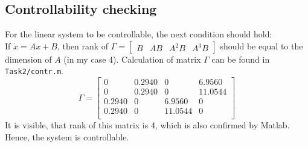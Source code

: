 \documentclass[a4paper,12pt]{article}
\begin{document}
    \subsection{Controllability checking}
    For the linear system to be controllable, the next condition should hold:\\
    If $\dot x = Ax + B$, then rank of $\Gamma = 
    \begin{bmatrix}
        B & AB & A^2B & A^3B
    \end{bmatrix}$ should be equal to the dimension of $A$ (in my case 4).
    Calculation of matrix $\Gamma$ can be found in \texttt{Task2/contr.m}.
    \begin{equation}
        \Gamma = 
        \begin{bmatrix}
        0 & 0.2940 & 0 & 6.9560\\
        0 & 0.2940 & 0 & 11.0544\\
        0.2940 & 0 & 6.9560 & 0\\
        0.2940 & 0 & 11.0544 & 0\\
        \end{bmatrix}
    \end{equation}
    It is visible, that rank of this matrix is 4, which is also confirmed by Matlab.
    Hence, the system is controllable.
\end{document}
